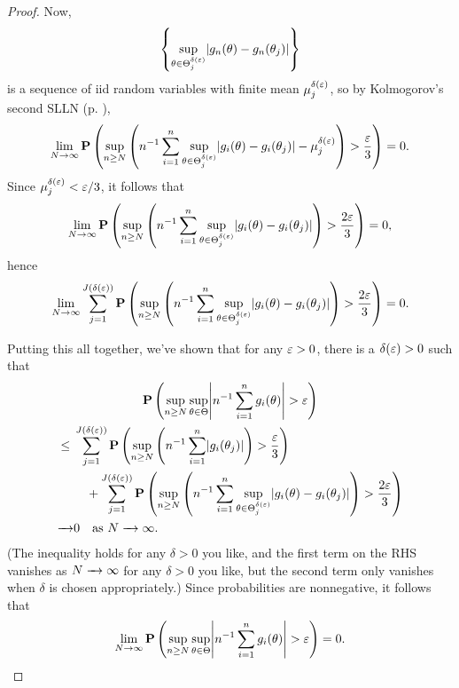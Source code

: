 \documentclass[11pt,letterpaper,reqno,oneside]{article}
\begin{document}
\begin{proof}
	Now,
	\begin{equation*}
		\left\{ \sup_{\theta \in \Theta_j^{\delta(\eps)}} 
		\abs*{ g_n(\theta) - g_n(\theta_j) } \right\}
	\end{equation*}
	is a sequence of iid random variables with finite mean $\mu^{\delta(\varepsilon)}_j$, so by Kolmogorov's second SLLN (p. \pageref{theorem:Kolmogorov_2nd_SLLN}),
	\begin{equation*}
		\lim_{N\to\infty}
		\PP\left(
		\sup_{n \geq N}
		\left(
		n^{-1} \sum_{i=1}^n \sup_{\theta \in \Theta^{\delta(\eps)}_j} 
		\abs*{ g_i(\theta) - g_i(\theta_j) }
		- \mu^{\delta(\eps)}_j
		\right)
		> \frac{\eps}{3}
		\right) = 0 .
	\end{equation*}
	Since $\mu^{\delta(\varepsilon)}_j < \varepsilon/3$, it follows that
	\begin{equation*}
		\lim_{N\to\infty}
		\PP\left(
		\sup_{n \geq N}
		\left(
		n^{-1} \sum_{i=1}^n \sup_{\theta \in \Theta^{\delta(\eps)}_j} 
		\abs*{ g_i(\theta) - g_i(\theta_j) }
		\right)
		> \frac{2\eps}{3}
		\right) = 0 ,
	\end{equation*}
	hence
	\begin{equation*}
		\lim_{N\to\infty}
		\sum_{j=1}^{J(\delta(\eps))}
		\PP\left(
		\sup_{n \geq N}
		\left(
		n^{-1} \sum_{i=1}^n \sup_{\theta \in \Theta^{\delta(\eps)}_j} 
		\abs*{ g_i(\theta) - g_i(\theta_j) }
		\right)
		> \frac{2\eps}{3}
		\right) = 0 .
	\end{equation*}
	

	Putting this all together, we've shown that for any $\varepsilon>0$, there is a $\delta(\varepsilon)>0$ such that
	\begin{multline*}
		\PP\left(
		\sup_{n \geq N}
		\sup_{\theta \in \Theta} 
		\abs*{ n^{-1} \sum_{i=1}^n g_i(\theta) }
		> \eps \right)
		\\
		\begin{aligned}
			\leq{}&
			\sum_{j=1}^{J(\delta(\eps))}
			\PP\left(
			\sup_{n \geq N}
			\left( n^{-1} \sum_{i=1}^n \abs*{ g_i(\theta_j) } \right)
			> \frac{\eps}{3}
			\right)
			\\
			&\quad
			+ \sum_{j=1}^{J(\delta(\eps))} \PP\left(
			\sup_{n \geq N}
			\left(
			n^{-1} \sum_{i=1}^n \sup_{\theta \in \Theta^{\delta(\eps)}_j} 
			\abs*{ g_i(\theta) - g_i(\theta_j) }
			\right)
			> \frac{2\eps}{3}
			\right) 
			\\
			\conv&
			0
			\quad\text{as $N\conv\infty$} .
		\end{aligned}
	\end{multline*}
	(The inequality holds for any $\delta>0$ you like, and the first term on the RHS vanishes as $N\xrightarrow{\;\;\;}\infty$ for any $\delta>0$ you like, but the second term only vanishes when $\delta$ is chosen appropriately.) Since probabilities are nonnegative, it follows that
	\begin{equation*}
		\lim_{N\to\infty}
		\PP\left(
		\sup_{n \geq N}
		\sup_{\theta \in \Theta} 
		\abs*{ n^{-1} \sum_{i=1}^n g_i(\theta) }
		> \eps \right)
		= 0 . \qedhere
	\end{equation*}
\end{proof}
\end{document}
